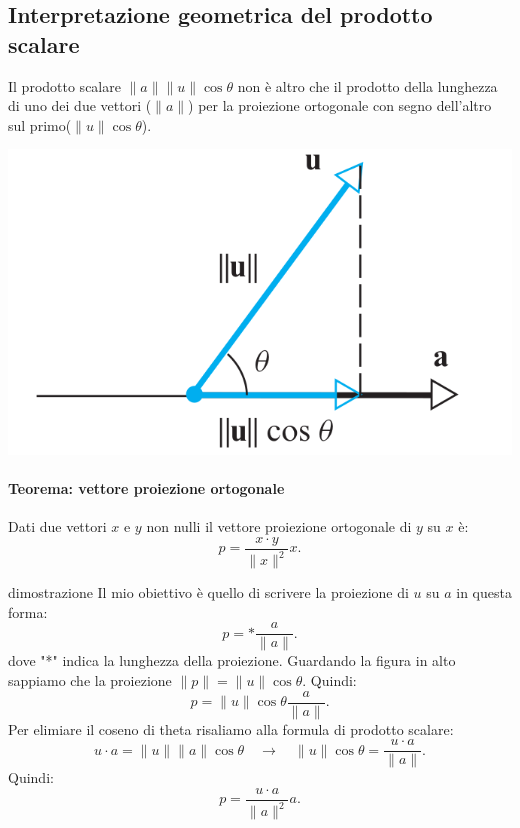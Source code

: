 \documentclass[x11names]{article}
\begin{document}
\subsection{Interpretazione geometrica del prodotto scalare}
Il prodotto scalare $\|a\|\|u\|\cos{\theta}$ non è altro che il prodotto della lunghezza di uno dei due vettori ($\|a\|$) per la proiezione ortogonale con segno dell'altro sul primo($\|u\|\cos{\theta}$).

\begin{center}
\includegraphics[scale=0.25]{figures/proj.png}
\end{center}


\begin{center}
\colorbox{Bisque1}{\begin{minipage}{5.75in}
\begin{yes1}{}
\paragraph{Teorema: vettore proiezione ortogonale}
Dati due vettori $x$ e $y$ non nulli il vettore proiezione ortogonale di $y$ su $x$ è:
\[
p = \frac{x\cdot y}{\|x\|^2}x
.\] 
\end{yes1}
\end{minipage}}        
\end{center}

\begin{es}{dimostrazione}
Il mio obiettivo è quello di scrivere la proiezione di $u$ su $a$ in questa forma:
\[
p = * \frac{a}{\|a\|}
.\] 
dove "*" indica la lunghezza della proiezione.
Guardando la figura in alto sappiamo che la proiezione $\|p\| = \|u\|\cos{\theta}$. Quindi:
\[
p = \|u\|\cos{\theta} \frac{a}{\|a\|} 
.\] 
Per elimiare il coseno di theta risaliamo alla formula di prodotto scalare:
\[
u \cdot a = \|u\|\|a\|\cos{\theta} \quad \longrightarrow \quad \|u\|\cos{\theta} = \frac{u\cdot a}{\|a\|}
.\] 
Quindi:
\[
p = \frac{u\cdot a}{\|a\|^2}a
.\] 
\end{es}
\end{document}
